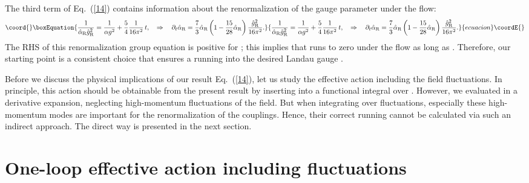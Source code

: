 \documentclass[a4paper,12pt]{article}
\providecommand{\re}[1]{~(\ref{#1})}\usepackage{useful_macros}
\begin{document}
The third term of Eq.\re{14} contains information about the
renormalization of the gauge parameter \myHighlight{$\alpha$}\coordHE{} under the flow:
\begin{equation}\coord{}\boxEquation{
\frac{1}{\hat{\alpha}_{\text{R}} \hat{g}_{\text{R}}^2}
=\frac{1}{\alpha g^2} + \frac{5}{4} \frac{1}{16\pi^2}\,
t,\quad\Rightarrow\quad 
\partial_t \hat{\alpha}_{\text{R}} = \frac{7}{3}
\hat{\alpha}_{\text{R}} \left( 1- \frac{15}{28}
  \hat{\alpha}_{\text{R}}\right)
\frac{\hat{g}_{\text{R}}^2}{16\pi^2}. \label{16} 
}{
\frac{1}{\hat{\alpha}_{\text{R}} \hat{g}_{\text{R}}^2}
=\frac{1}{\alpha g^2} + \frac{5}{4} \frac{1}{16\pi^2}\,
t,\quad\Rightarrow\quad 
\partial_t \hat{\alpha}_{\text{R}} = \frac{7}{3}
\hat{\alpha}_{\text{R}} \left( 1- \frac{15}{28}
  \hat{\alpha}_{\text{R}}\right)
\frac{\hat{g}_{\text{R}}^2}{16\pi^2}. }{ecuacion}\coordE{}\end{equation}
The RHS of this renormalization group equation is positive for
\coordHE{}; this implies that \myHighlight{$\alpha$}\coordHE{} runs
to zero under the flow as long as
\coordHE{}. Therefore, our starting point
\coordHE{} is a consistent choice that ensures a running into
the desired Landau gauge \coordHE{}. 

Before we discuss the physical implications of our result Eq.\re{14},
let us study the effective action including the \myHighlight{$\mn$}\coordHE{} field
fluctuations. In principle, this action should be obtainable from the
present result by inserting \coordHE{} into a functional
integral over \myHighlight{$\mn$}\coordHE{}. However, we evaluated \coordHE{} in a
derivative expansion, neglecting high-momentum fluctuations of the
\myHighlight{$\mn$}\coordHE{} field. But when integrating over \myHighlight{$\mn$}\coordHE{} fluctuations, especially
these high-momentum modes are important for the renormalization of the
couplings. Hence, their correct running cannot be calculated via such
an indirect approach. The direct way is presented in the next section.


\section{One-loop effective action including \myHighlight{$\mn$}\coordHE{} fluctuations}
\label{nfluc}
\end{document}
